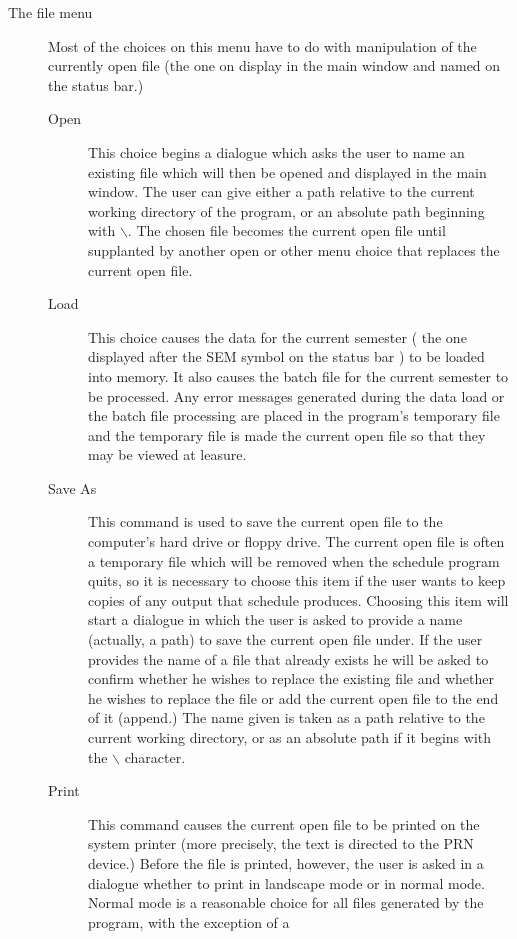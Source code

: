 \begin{description}
\item[The file menu] Most of the choices on this menu have to do with
manipulation of the currently open file (the one on display in the main
window and named on the status bar.)    

\begin{description}
\item[Open] This choice begins a dialogue which asks the user to name an existing
file which will then be opened and displayed in the main window. The user
can give either a path relative to the current working directory of the
program, or an absolute path beginning with $\backslash$. The chosen file
becomes the current open file until supplanted by another open or other menu
choice that replaces the current open file. 
\item[Load] This choice causes the data for the current semester ( the one
displayed after the SEM symbol on the status bar ) to be loaded into memory.
It also causes the batch file for the current semester to be processed. 
Any error messages generated during the data load or the batch file processing
are placed in the program's temporary file and the temporary file is made
the current open file so that they may be viewed at leasure.
\item[Save As] This command is used to save the current open file to the
computer's hard drive or floppy drive. The current open file is often a
temporary file which will be removed when the schedule program quits, so
it is necessary to choose this item if the user wants to keep copies of any
output that schedule produces. Choosing this item will start a dialogue in
which the user is asked to provide a name (actually, a path) to save the
current open file under. If the user provides the name of a file that
already exists he will be asked to confirm whether he wishes to replace
the existing file and whether he wishes to replace the file or add the
current open file to the end of it (append.)
The name given is taken as a path relative to the current
working directory, or as an absolute path if it begins with the $\backslash$
character.
\item[Print] This command causes the current open file to be printed on
the system printer (more precisely, the text is directed to the PRN device.)
Before the file is printed, however, the user is asked in a dialogue whether
to print in landscape mode or in normal mode. Normal mode is a reasonable
choice for all files generated by the program, with the exception of a

\end{description}
\end{description}
